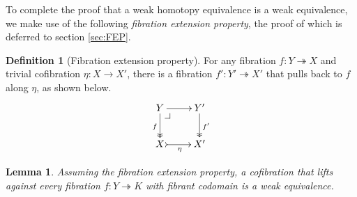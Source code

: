 \documentclass[11pt]{amsart}
\makeatletter
\newcommand{\ra}{\ensuremath{\rightarrow}}
\newcommand{\onto}{\ensuremath{\twoheadrightarrow}}
\newtheorem{proposition}[theorem]{Proposition}
\newtheorem{lemma}[theorem]{Lemma}
\theoremstyle{remark}
\theoremstyle{definition}
\newtheorem{definition}[theorem]{Definition}
\newcommand{\pbcorner}[1][dr]{\save*!/#1-1.2pc/#1:(-1,1)@^{|-}\restore}
\makeatother
\begin{document}

To complete the proof that a weak homotopy equivalence is a weak equivalence, we make use of the following \emph{fibration extension property}, the proof of which is deferred to section \ref{sec:FEP}.

\begin{definition}[Fibration extension property]\label{def:fibextreplace}
For any fibration $ f : Y \onto X$ and trivial cofibration $\eta: X\ra X'$,
there is a fibration $f' : Y' \onto X'$ that pulls back to $f$ along $\eta$, as shown below.
\begin{equation}\label{diagram:FEP}
\xymatrix{
Y \ar@{->>}[d]_{f} \ar[r]  \pbcorner & Y' \ar@{>>}[d]^{f'} \\
X \ar@{>->}[r]_{\eta} &  X'
}
\end{equation}
\end{definition}

\begin{lemma}\label{lemma:CofWEiffFibLift}
Assuming the fibration extension property, a cofibration that lifts against every fibration $f : Y\onto K$ with fibrant codomain is a weak equivalence.
\end{lemma}
\end{document}
